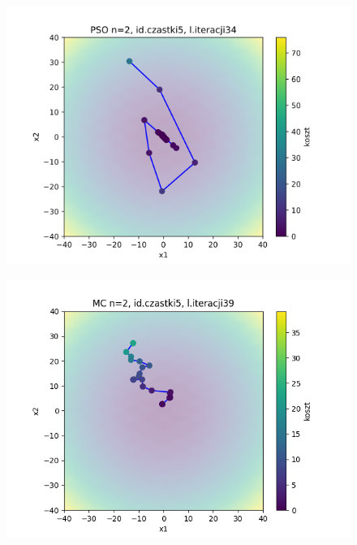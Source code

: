 \documentclass[11pt, a4paper, oneside]{article}
\begin{document}

\begin{figure}[H]
\centering
\begin{minipage}[b]{\dimexpr.5\textwidth-1em}
  \centering
  \includegraphics[width=1\linewidth]{grafiki/Wykresy2d/zad1_pso_plot_5.png}
  \label{fig:najepszeRozwiazanie:PSO1}
\end{minipage} \hfill
\begin{minipage}[b]{\dimexpr.5\textwidth-1em}
  \centering
  \includegraphics[width=1\linewidth]{grafiki/Wykresy2d/Zad1_MC_plot_5.png}
  \label{fig:najepszeRozwiazanie:MC1}
\end{minipage}
\end{figure}
\end{document}
